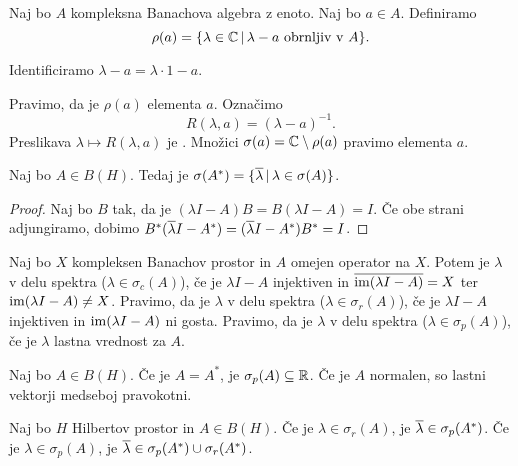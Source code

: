 
Naj bo $A$ kompleksna Banachova algebra z enoto.
Naj bo $a \in A$.
Definiramo
\[
  \rho(a) = \{ \lambda \in \mathbb{C} \,|\, \text{$\lambda - a$ obrnljiv v $A$} \}.
\]

\begin{opomba}
  Identificiramo $\lambda - a = \lambda \cdot 1 - a$.
\end{opomba}

Pravimo, da je $\rho(a)$  elementa $a$.
Označimo
\[
  R(\lambda, a) = (\lambda - a)^{-1}.
\]
Preslikava $\lambda \mapsto R(\lambda, a)$ je .
Množici $\sigma(a) = \mathbb{C} \setminus \rho(a)$ pravimo  elementa $a$.

\begin{trditev}
  Naj bo $A \in B(H)$.
  Tedaj je $\sigma(A^*) = \{ \overline{\lambda} \,|\, \lambda \in \sigma(A) \}$.
\end{trditev}

\begin{proof}
  Naj bo $B$ tak, da je $(\lambda I - A) B = B(\lambda I - A) = I$.
  Če obe strani adjungiramo, dobimo $B^* (\overline{\lambda} I - A^*) =
  (\overline{\lambda} I - A^*) B^* = I$.
\end{proof}

\begin{definicija}
  Naj bo $X$ kompleksen Banachov prostor in $A$ omejen operator na $X$.
  Potem je $\lambda$ v  delu spektra ($\lambda \in \sigma_c(A)$),
  če je $\lambda I - A$ injektiven in $\overline{\operatorname{im}(\lambda I - A)} = X$ ter
  $\operatorname{im}(\lambda I - A) \ne X$.
  Pravimo, da je $\lambda$ v  delu spektra ($\lambda \in
  \sigma_r(A)$), če je $\lambda I - A$ injektiven in $\operatorname{im} (\lambda I - A)$ ni
  gosta.
  Pravimo, da je $\lambda$ v  delu spektra ($\lambda \in
  \sigma_p(A)$), če je $\lambda$ lastna vrednost za $A$.
\end{definicija}

\begin{trditev}
  Naj bo $A \in B(H)$.
  Če je $A = A^*$, je $\sigma_p(A) \subseteq \mathbb{R}$.
  Če je $A$ normalen, so lastni vektorji medseboj pravokotni.
\end{trditev}

\begin{trditev}
  Naj bo $H$ Hilbertov prostor in $A \in B(H)$.
  Če je $\lambda \in \sigma_r(A)$, je $\overline{\lambda} \in \sigma_p(A^*)$.
  Če je $\lambda \in \sigma_p(A)$, je $\overline{\lambda} \in \sigma_p(A^*) \cup
  \sigma_r(A^*)$.
\end{trditev}

